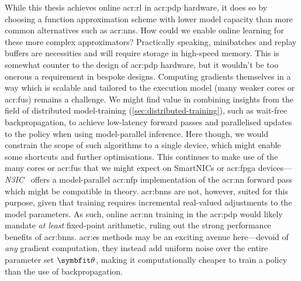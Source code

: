 
While this thesis achieves online \gls{acr:rl} in \gls{acr:pdp} hardware, it does so by choosing a function approximation scheme with lower model capacity than more common alternatives such as \glspl{acr:nn}.
How could we enable online learning for these more complex approximators?
Practically speaking, minibatches and replay buffers are necessities and will require storage in high-speed memory.
This is somewhat counter to the design of \gls{acr:pdp} hardware, but it wouldn't be too onerous a requirement in bespoke designs.
Computing gradients themselves in a way which is scalable and tailored to the execution model (many weaker cores or \glspl{acr:fu}) remains a challenge.
We might find value in combining insights from the field of distributed model-training (\cref{sec:distributed-training}), such as wait-free backpropagation, to achieve low-latency forward passes and parallelised updates to the policy when using model-parallel inference.
Here though, we would constrain the scope of such algorithms to a single device, which might enable some shortcuts and further optimisations.
This continues to make use of the many cores or \glspl{acr:fu} that we might expect on SmartNICs or \gls{acr:fpga} devices---\emph{N3IC}~\parencite{DBLP:journals/corr/abs-2009-02353} offers a model-parallel \gls{acr:nfp} implementation of the \gls{acr:nn} forward pass which might be compatible in theory.
\glspl{acr:bnn} are not, however, suited for this purpose, given that training requires incremental real-valued adjustments to the model parameters.
As such, online \gls{acr:nn} training in the \gls{acr:pdp} would likely mandate \emph{at least} fixed-point arithmetic, ruling out the strong performance benefits of \glspl{acr:bnn}.
\gls{acr:es} methods may be an exciting avenue here---devoid of \emph{any} gradient computation, they instead add uniform noise over the entire parameter set $\wvec{}$, making it computationally cheaper to train a policy than the use of backpropagation.

